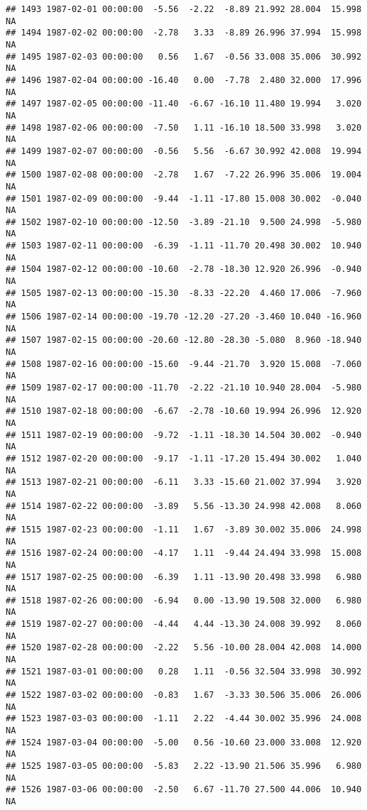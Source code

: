 \documentclass{article}\usepackage{graphicx, color}
\makeatletter
\newenvironment{kframe}{%
 \def\at@end@of@kframe{}%
 \ifinner\ifhmode%
  \def\at@end@of@kframe{\end{minipage}}%
  \begin{minipage}{\columnwidth}%
 \fi\fi%
 \def\FrameCommand##1{\hskip\@totalleftmargin \hskip-\fboxsep
 \colorbox{shadecolor}{##1}\hskip-\fboxsep
     \hskip-\linewidth \hskip-\@totalleftmargin \hskip\columnwidth}%
 \MakeFramed {\advance\hsize-\width
   \@totalleftmargin\z@ \linewidth\hsize
   \@setminipage}}%
 {\par\unskip\endMakeFramed%
 \at@end@of@kframe}
\newenvironment{knitrout}{}{} %
\makeatother
\begin{document}
\begin{knitrout}
\begin{kframe}
\begin{verbatim}
## 1493 1987-02-01 00:00:00  -5.56  -2.22  -8.89 21.992 28.004  15.998     NA
## 1494 1987-02-02 00:00:00  -2.78   3.33  -8.89 26.996 37.994  15.998     NA
## 1495 1987-02-03 00:00:00   0.56   1.67  -0.56 33.008 35.006  30.992     NA
## 1496 1987-02-04 00:00:00 -16.40   0.00  -7.78  2.480 32.000  17.996     NA
## 1497 1987-02-05 00:00:00 -11.40  -6.67 -16.10 11.480 19.994   3.020     NA
## 1498 1987-02-06 00:00:00  -7.50   1.11 -16.10 18.500 33.998   3.020     NA
## 1499 1987-02-07 00:00:00  -0.56   5.56  -6.67 30.992 42.008  19.994     NA
## 1500 1987-02-08 00:00:00  -2.78   1.67  -7.22 26.996 35.006  19.004     NA
## 1501 1987-02-09 00:00:00  -9.44  -1.11 -17.80 15.008 30.002  -0.040     NA
## 1502 1987-02-10 00:00:00 -12.50  -3.89 -21.10  9.500 24.998  -5.980     NA
## 1503 1987-02-11 00:00:00  -6.39  -1.11 -11.70 20.498 30.002  10.940     NA
## 1504 1987-02-12 00:00:00 -10.60  -2.78 -18.30 12.920 26.996  -0.940     NA
## 1505 1987-02-13 00:00:00 -15.30  -8.33 -22.20  4.460 17.006  -7.960     NA
## 1506 1987-02-14 00:00:00 -19.70 -12.20 -27.20 -3.460 10.040 -16.960     NA
## 1507 1987-02-15 00:00:00 -20.60 -12.80 -28.30 -5.080  8.960 -18.940     NA
## 1508 1987-02-16 00:00:00 -15.60  -9.44 -21.70  3.920 15.008  -7.060     NA
## 1509 1987-02-17 00:00:00 -11.70  -2.22 -21.10 10.940 28.004  -5.980     NA
## 1510 1987-02-18 00:00:00  -6.67  -2.78 -10.60 19.994 26.996  12.920     NA
## 1511 1987-02-19 00:00:00  -9.72  -1.11 -18.30 14.504 30.002  -0.940     NA
## 1512 1987-02-20 00:00:00  -9.17  -1.11 -17.20 15.494 30.002   1.040     NA
## 1513 1987-02-21 00:00:00  -6.11   3.33 -15.60 21.002 37.994   3.920     NA
## 1514 1987-02-22 00:00:00  -3.89   5.56 -13.30 24.998 42.008   8.060     NA
## 1515 1987-02-23 00:00:00  -1.11   1.67  -3.89 30.002 35.006  24.998     NA
## 1516 1987-02-24 00:00:00  -4.17   1.11  -9.44 24.494 33.998  15.008     NA
## 1517 1987-02-25 00:00:00  -6.39   1.11 -13.90 20.498 33.998   6.980     NA
## 1518 1987-02-26 00:00:00  -6.94   0.00 -13.90 19.508 32.000   6.980     NA
## 1519 1987-02-27 00:00:00  -4.44   4.44 -13.30 24.008 39.992   8.060     NA
## 1520 1987-02-28 00:00:00  -2.22   5.56 -10.00 28.004 42.008  14.000     NA
## 1521 1987-03-01 00:00:00   0.28   1.11  -0.56 32.504 33.998  30.992     NA
## 1522 1987-03-02 00:00:00  -0.83   1.67  -3.33 30.506 35.006  26.006     NA
## 1523 1987-03-03 00:00:00  -1.11   2.22  -4.44 30.002 35.996  24.008     NA
## 1524 1987-03-04 00:00:00  -5.00   0.56 -10.60 23.000 33.008  12.920     NA
## 1525 1987-03-05 00:00:00  -5.83   2.22 -13.90 21.506 35.996   6.980     NA
## 1526 1987-03-06 00:00:00  -2.50   6.67 -11.70 27.500 44.006  10.940     NA

\end{verbatim}
\end{kframe}
\end{knitrout}
\end{document}
